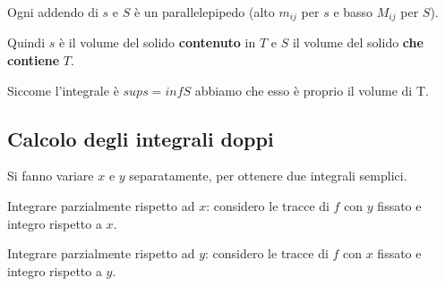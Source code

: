 \documentclass[../appunti-analisi.tex]{subfiles}
\begin{document}
Ogni addendo di $s$ e $S$ è un parallelepipedo (alto $m_{ij}$ per $s$ e basso $M_{ij}$ per $S$).

Quindi $s$ è il volume del solido \textbf{contenuto} in $T$ e $S$ il volume del solido \textbf{che contiene} $T$.


Siccome l'integrale è $sup s = inf S$ abbiamo che esso è proprio il volume di T.





\newpage 

\subsection{Calcolo degli integrali doppi}

Si fanno variare $x$ e $y$ separatamente, per ottenere due integrali semplici.

Integrare parzialmente rispetto ad $x$: considero le tracce di $f$ con $y$ fissato e integro rispetto a $x$. 

Integrare parzialmente rispetto ad $y$: considero le tracce di $f$ con $x$ fissato e integro rispetto a $y$. 
\end{document}
